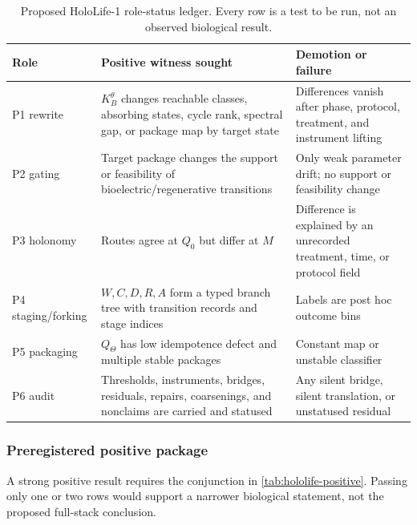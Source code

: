 \begin{table}[htbp]
\centering
\scriptsize
\begin{tabularx}{\textwidth}{@{}lXX@{}}
\toprule
Role & Positive witness sought & Demotion or failure \\
\midrule
P1 rewrite &
$K_B^\theta$ changes reachable classes, absorbing states, cycle rank,
spectral gap, or package map by target state &
Differences vanish after phase, protocol, treatment, and instrument lifting
\\
P2 gating &
Target package changes the support or feasibility of bioelectric/regenerative
transitions &
Only weak parameter drift; no support or feasibility change \\
P3 holonomy &
Routes agree at $Q_0$ but differ at $M$ &
Difference is explained by an unrecorded treatment, time, or protocol field
\\
P4 staging/forking &
$W,C,D,R,A$ form a typed branch tree with transition records and stage
indices &
Labels are post hoc outcome bins \\
P5 packaging &
$Q_\Theta$ has low idempotence defect and multiple stable packages &
Constant map or unstable classifier \\
P6 audit &
Thresholds, instruments, bridges, residuals, repairs, coarsenings, and
nonclaims are carried and statused &
Any silent bridge, silent translation, or unstatused residual \\
\bottomrule
\end{tabularx}
\caption{Proposed HoloLife-1 role-status ledger.  Every row is a test to be
run, not an observed biological result.}
\label{tab:hololife-role-ledger}
\end{table}

\subsubsection{Preregistered positive package}

A strong positive result requires the conjunction in
\cref{tab:hololife-positive}.  Passing only one or two rows would support a
narrower biological statement, not the proposed full-stack conclusion.

